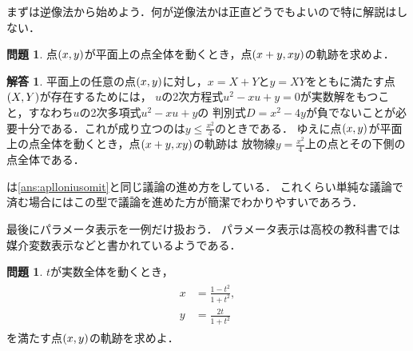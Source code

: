 \documentclass[11pt,a4paper]{ltjsarticle}
\newcommand*{\coord}[1]{\paren{#1}}
\theoremstyle{definition}
\newtheorem{que}[dfn]{問題}
\newtheorem{ans}[dfn]{解答}
\begin{document}
まずは逆像法から始めよう．何が逆像法かは正直どうでもよいので特に解説はしない．

\begin{que} \label{que:invimage}
  点$\coord{x,y}$が平面上の点全体を動くとき，点$\coord{x+y, xy}$の軌跡を求めよ．
\end{que}

\begin{ans} \label{ans:invimage}
  平面上の任意の点$\coord{x,y}$に対し，$x = X + Y$と$y = XY$をともに満たす点$\coord{X,Y}$が存在するためには，
  $u$の2次方程式$u^2 - xu + y = 0$が実数解をもつこと，すなわち$u$の2次多項式$u^2 - xu + y$の
  判別式$D = x^2 - 4y$が負でないことが必要十分である．これが成り立つのは$y \leq \frac{x^2}{4}$のときである．
  ゆえに点$\coord{x, y}$が平面上の点全体を動くとき，点$\coord{x+y, xy}$の軌跡は
  放物線$y = \frac{x^2}{4}$上の点とその下側の点全体である．
\end{ans}

は\cref{ans:aplloniusomit}と同じ議論の進め方をしている．
これくらい単純な議論で済む場合にはこの型で議論を進めた方が簡潔でわかりやすいであろう．

最後にパラメータ表示を一例だけ扱おう．
パラメータ表示は高校の教科書では媒介変数表示などと書かれているようである．

\begin{que} \label{que:parameter}
  $t$が実数全体を動くとき，
  \begin{align}
    \begin{aligned}
      x & = \frac{1 - t^2}{1 + t^2}, \\
      y & = \frac{2t}{1 + t^2}
    \end{aligned}
    \label{eq:parameter}
  \end{align}
  を満たす点$\coord{x, y}$の軌跡を求めよ．
\end{que}
\end{document}
